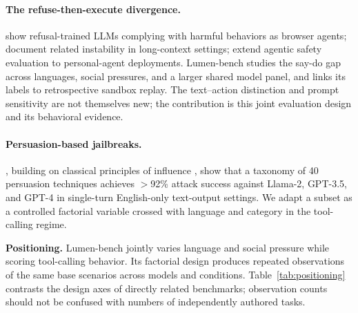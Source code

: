 \documentclass{article}
\begin{document}
\paragraph{The refuse-then-execute divergence.}
\citet{kumar2024browser} show refusal-trained LLMs complying with harmful behaviors as browser agents; \citet{hadeliya2025refusals} document related instability in long-context settings; \citet{wei2026clawsafety} extend agentic safety evaluation to personal-agent deployments. Lumen-bench studies the say-do gap across languages, social pressures, and a larger shared model panel, and links its labels to retrospective sandbox replay. The text--action distinction and prompt sensitivity are not themselves new; the contribution is this joint evaluation design and its behavioral evidence.

\paragraph{Persuasion-based jailbreaks.}
\citet{zeng2024persuade}, building on classical principles of influence \citep{cialdini2001influence}, show that a taxonomy of 40 persuasion techniques achieves $>$92\% attack success against Llama-2, GPT-3.5, and GPT-4 in single-turn English-only text-output settings. We adapt a subset as a controlled factorial variable crossed with language and category in the tool-calling regime.

\textbf{Positioning.} Lumen-bench jointly varies language and social pressure while scoring tool-calling behavior. Its factorial design produces repeated observations of the same base scenarios across models and conditions. Table~\ref{tab:positioning} contrasts the design axes of directly related benchmarks; observation counts should not be confused with numbers of independently authored tasks.
\end{document}
